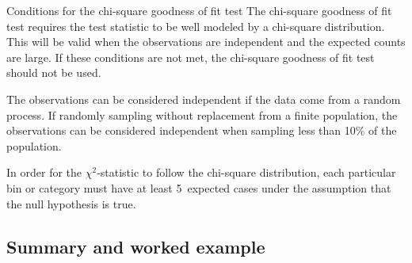 %
\begin{onebox}{Conditions for the chi-square goodness of fit test}
The chi-square goodness of fit test requires the test statistic to be well modeled by a chi-square distribution.  This will be valid when the observations are independent and the expected counts are large.  If these conditions are not met, the chi-square goodness of fit test should not be used.\vspace{-1mm}
\begin{description}
\setlength{\itemsep}{0mm}
\item[Independence.] The observations can be considered independent if the data come from a random process.  If randomly sampling without replacement from a finite population, the observations can be considered independent when sampling less than 10\% of the population.  
\item[Large expected counts.] In order for the $\chi^2$-statistic to follow the chi-square distribution, each particular bin or category must have at least \mbox{5~expected} cases under the assumption that the null hypothesis is true.
\end{description}
\end{onebox}


\subsection{Summary and worked example}


